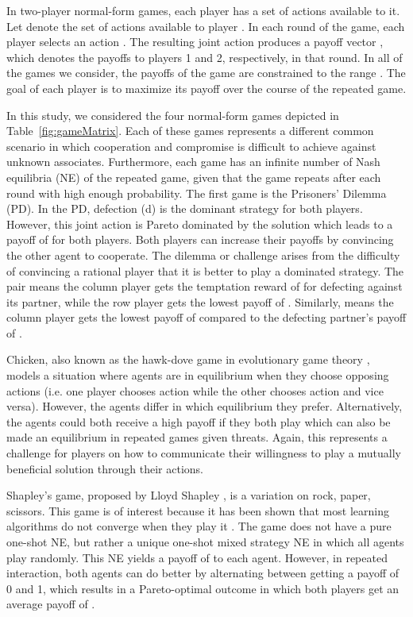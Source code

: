 \documentclass[fleqn,10pt]{SelfArx}
\begin{document}
In two-player normal-form games, each player has a set of actions available to it.  Let  denote the set of actions available to player .  In each round of the game, each player  selects an action .  The resulting joint action  produces a payoff vector , which denotes the payoffs to players 1 and 2, respectively, in that round.  In all of the games we consider, the payoffs of the game are constrained to the range .  The goal of each player is to maximize its payoff over the course of the repeated game.

In this study, we considered the four normal-form games depicted in Table~\ref{fig:gameMatrix}.  Each of these games represents a different common scenario in which cooperation and compromise is difficult to achieve against unknown associates.  Furthermore, each game has an infinite number of Nash equilibria (NE) of the repeated game, given that the game repeats after each round with high enough probability.  The first game is the Prisoners' Dilemma (PD). In the PD, defection (d) is the dominant strategy for both players. However, this joint action is Pareto dominated by the solution  which leads to a payoff of  for both players.  Both players can increase their payoffs by convincing the other agent to cooperate. The dilemma or challenge arises from the difficulty of convincing a rational player that it is better to play a dominated strategy. The pair  means the column player gets the temptation reward of  for defecting against its partner, while the row player gets the lowest payoff of . Similarly,  means the column player gets the lowest payoff of  compared to the defecting partner's payoff of .

Chicken, also known as the hawk-dove game in evolutionary game theory \cite{Smith:etal:1973}, models a situation where agents are in equilibrium when they choose opposing actions (i.e. one player chooses action  while the other chooses action  and vice versa). However, the agents differ in which equilibrium they prefer. Alternatively, the agents could both receive a high payoff if they both play  which can also be made an equilibrium in repeated games given threats. Again, this represents a challenge for players on how to communicate their willingness to play a mutually beneficial solution through their actions.

Shapley's game, proposed by Lloyd Shapley \cite{Shapley:1964}, is a variation on rock, paper, scissors. This game is of interest because it has been shown that most learning algorithms do not converge when they play it \cite{FictitiousPlay}. The game does not have a pure one-shot NE, but rather a unique one-shot mixed strategy NE in which all agents play randomly. This NE yields a payoff of  to each agent. However, in repeated interaction, both agents can do better by alternating between getting  a payoff of 0 and 1, which results in a Pareto-optimal outcome in which both players get an average payoff of .
\end{document}
